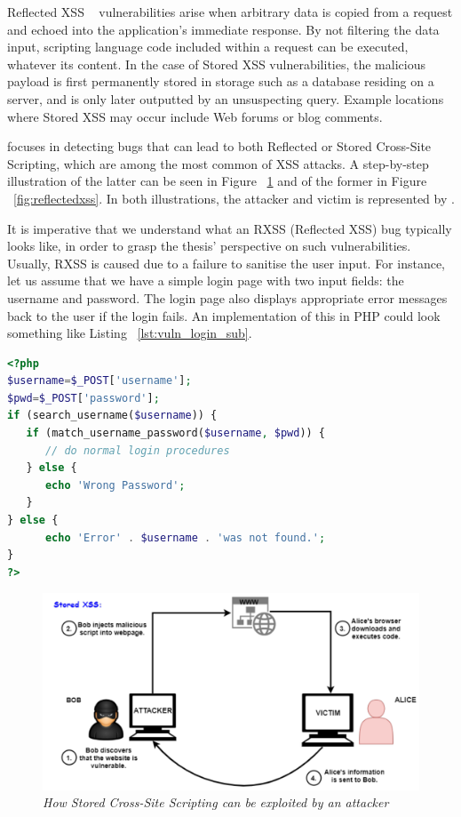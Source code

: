 Reflected XSS ~\cite{rxss_def} vulnerabilities arise when arbitrary data is copied from a request and echoed into the application's immediate response. By not filtering the data input, scripting language code included within a request can be executed, whatever its content. In the case of Stored XSS vulnerabilities, the malicious payload is first permanently stored in storage such as a database residing on a server, and is only later outputted by an unsuspecting query. Example locations where Stored XSS may occur include Web forums or blog comments. 

\pname{} focuses in detecting bugs that can lead to both Reflected or Stored Cross-Site Scripting, which are among the most common of XSS attacks. A step-by-step illustration of the latter can be seen in Figure ~\ref{fig:storedxss} and of the former in Figure ~\ref{fig:reflectedxss}. In both illustrations, the attacker and victim is represented by \pname{}.

It is imperative that we understand what an RXSS (Reflected XSS) bug typically looks like, in order to grasp the thesis' perspective on such vulnerabilities. Usually, RXSS is caused due to a failure to sanitise the user input. For instance, let us assume that we have a simple login page with two input fields: the username and password. The login page also displays appropriate error messages back to the user if the login fails. An implementation of this in PHP could look something like Listing ~\ref{lst:vuln_login_sub}.

\begin{lstlisting}[aboveskip=\baselineskip, showstringspaces=false, frame=single, language=PHP, caption={\textit{Vulnerable login form}}, numberstyle=\color{gray}, numbersep=5pt, label={lst:vuln_login_sub}]
<?php
$username=$_POST['username'];
$pwd=$_POST['password'];
if (search_username($username)) {
   if (match_username_password($username, $pwd)) {
      // do normal login procedures
   } else {
      echo 'Wrong Password';
   }
} else {
      echo 'Error' . $username . 'was not found.';
}
?>
\end{lstlisting}

\begin{figure}[ht]
 \centering
 \captionsetup{justification=centering}
 \includegraphics[width=\linewidth]{figures/storedxss.pdf}
 \caption{\textit{How Stored Cross-Site Scripting can be exploited by an attacker}}
 \label{fig:storedxss}
\end{figure}

